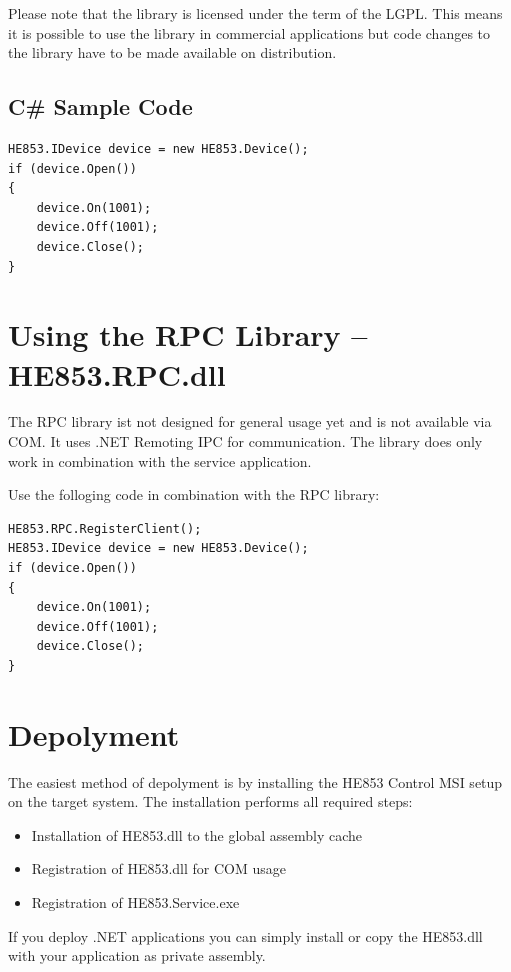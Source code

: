 \documentclass[
a4paper,
oneside,
halfparskip*,
normalheadings,
]
{scrbook}
\begin{document}
Please note that the library is licensed under the term of the LGPL. This means it is
possible to use the library in commercial applications but code changes to the library
have to be made available on distribution.

\subsection{C\# Sample Code}

\begin{verbatim}
HE853.IDevice device = new HE853.Device();
if (device.Open())
{
    device.On(1001);
    device.Off(1001);
    device.Close();
}
\end{verbatim}

\section{Using the RPC Library -- HE853.RPC.dll}

The RPC library ist not designed for general usage yet and is not available via COM.
It uses .NET Remoting IPC for communication. The library does only work in combination
with the service application.

Use the folloging code in combination with the RPC library:

\begin{verbatim}
HE853.RPC.RegisterClient();
HE853.IDevice device = new HE853.Device();
if (device.Open())
{
    device.On(1001);
    device.Off(1001);
    device.Close();
}
\end{verbatim}

\section{Depolyment}
The easiest method of depolyment is by installing the HE853 Control MSI setup on the target
system. The installation performs all required steps:

\begin{itemize}
  \item Installation of HE853.dll to the global assembly cache
	\item Registration of HE853.dll for COM usage
	\item Registration of HE853.Service.exe
\end{itemize}

If you deploy .NET applications you can simply install or copy the HE853.dll with your application
as private assembly.
\end{document}
